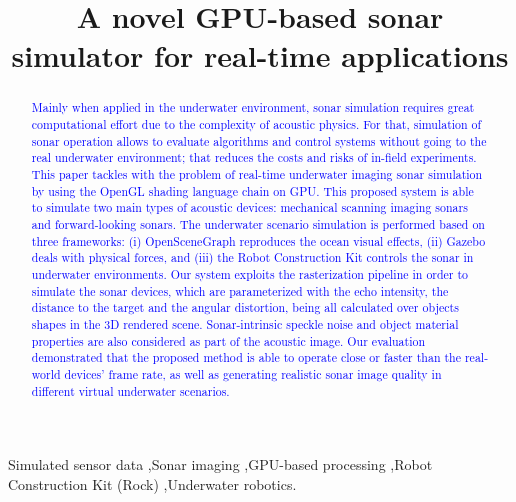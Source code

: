 \documentclass[final,5p,times]{elsarticle}
\begin{document}
\begin{frontmatter}


\title{A novel GPU-based sonar simulator for real-time applications}



\begin{abstract}

\textcolor{blue}{Mainly when applied in the underwater environment, sonar simulation requires great computational effort due to the complexity of acoustic physics. For that, simulation of sonar operation allows to evaluate algorithms and control systems without going to the real underwater environment; that reduces the costs and risks of in-field experiments. This paper tackles with the problem of real-time underwater imaging sonar simulation by using the OpenGL shading language chain on GPU. This proposed system is able to simulate two main types of acoustic devices: mechanical scanning imaging sonars and forward-looking sonars. The underwater scenario simulation is performed based on three frameworks: (i) OpenSceneGraph reproduces the ocean visual effects, (ii) Gazebo deals with physical forces, and (iii) the Robot Construction Kit controls the sonar in underwater environments. Our system exploits the rasterization pipeline in order to simulate the sonar devices, which are parameterized with the echo intensity, the distance to the target and the angular distortion, being all calculated over objects shapes in the 3D rendered scene. Sonar-intrinsic speckle noise and object material properties are also considered as part of the acoustic image. Our evaluation demonstrated that the proposed method is able to operate close or faster than the real-world devices' frame rate, as well as generating realistic sonar image quality in different virtual underwater scenarios.}

\end{abstract}

\begin{keyword}
Simulated sensor data
\sep Sonar imaging
\sep GPU-based processing
\sep Robot Construction Kit (Rock)
\sep Underwater robotics.

\end{keyword}

\end{frontmatter}
\end{document}
